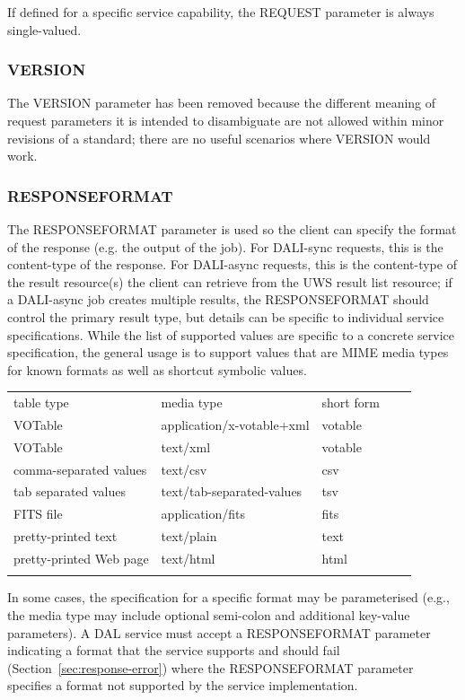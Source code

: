 \documentclass[11pt,letter]{ivoa}
\begin{document}
If defined for a specific service capability, the REQUEST parameter is always
single-valued.

\subsubsection{VERSION}
\label{sec:VERSION}
The VERSION parameter has been removed because the different
meaning of request
parameters it is intended to disambiguate are not allowed within minor
revisions of a standard; there are no useful scenarios where VERSION would work.

\subsubsection{RESPONSEFORMAT}
\label{sec:RESPONSEFORMAT}
The RESPONSEFORMAT parameter is used so the client can specify the format of the
response (e.g. the output of the job). For DALI-sync requests, this is the
content-type of the response. For DALI-async requests, this is the content-type
of the result resource(s) the client can retrieve from the UWS result list
resource; if a DALI-async job creates multiple results, the RESPONSEFORMAT
should control the primary result type, but details can be specific to
individual service specifications. While the list of supported values are
specific to a concrete service specification, the general usage is to support
values that are MIME media types \citep{std:MIME} for known
formats as well as
shortcut symbolic values.

\begin{tabular}{l l l l l}
\sptablerule
table type & media type & short form \\
\sptablerule
VOTable & application/x-votable+xml & votable & \\
VOTable & text/xml & votable & \\
comma-separated values & text/csv & csv & \\
tab separated values & text/tab-separated-values & tsv & \\
FITS file & application/fits & fits & \\
pretty-printed text & text/plain & text & \\
pretty-printed Web page & text/html & html & \\
\sptablerule
\label{tab:mimetypes}
\end{tabular}

In some cases, the specification for a specific format may be parameterised
(e.g., the media type may include optional semi-colon and additional key-value
parameters). A DAL service must accept a RESPONSEFORMAT parameter indicating a
format that the service supports and should  fail (Section~\ref{sec:response-error}) 
where the RESPONSEFORMAT parameter specifies a format not supported by the service
implementation.
\end{document}
